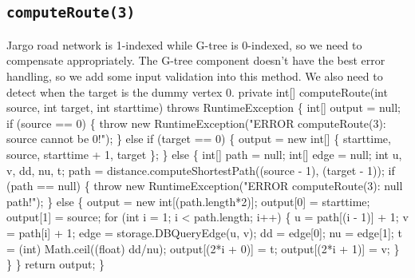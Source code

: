 \documentclass{article}
\def\nwendcode{\endtrivlist \endgroup}      %
\begin{document}
\subsection{{\tt{}\protect{}computeRoute(3)}}
Jargo road network is 1-indexed while G-tree is 0-indexed, so we need to
compensate appropriately. The G-tree component doesn't have the best error
handling, so we add some input validation into this method.
We also need to detect when the target is the dummy
vertex 0.
\nwenddocs{}\plusendmoddef
private int[] computeRoute(int source, int target, int starttime)
throws RuntimeException \{
  int[] output = null;
  if (source == 0) \{
    throw new RuntimeException("ERROR computeRoute(3): source cannot be 0!");
  \} else if (target == 0) \{
    output = new int[] \{ starttime, source, starttime + 1, target \};
  \} else \{
    int[] path = null;
    int[] edge = null;
    int u, v, dd, nu, t;
    path = distance.computeShortestPath((source - 1), (target - 1));
    if (path == null) \{
      throw new RuntimeException("ERROR computeRoute(3): null path!");
    \} else \{
      output = new int[(path.length*2)];
      output[0] = starttime;
      output[1] = source;
      for (int i = 1; i < path.length; i++) \{
        u = path[(i - 1)] + 1;
        v = path[i] + 1;
        edge = storage.DBQueryEdge(u, v);
        dd = edge[0];
        nu = edge[1];
        t = (int) Math.ceil((float) dd/nu);
        output[(2*i + 0)] = t;
        output[(2*i + 1)] = v;
      \}
    \}
  \}
  return output;
\}
\eatline
{}\nwendcode{}
\end{document}
